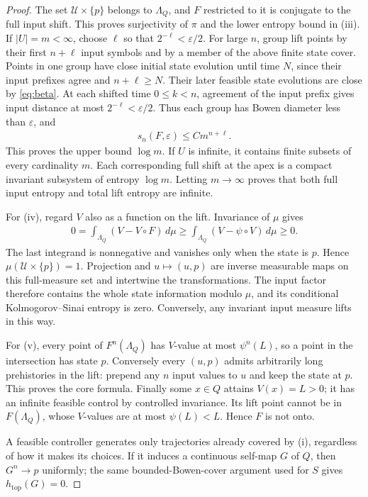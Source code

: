 \documentclass[11pt,a4paper]{article}
\theoremstyle{definition}
\theoremstyle{remark}
\begin{document}
\begin{proof}
The set \(\mathcal U\times\{p\}\) belongs to \(\Lambda_Q\), and \(F\) restricted to it is conjugate to the full input shift. This proves surjectivity of \(\pi\) and the lower entropy bound in (iii). If \(|U|=m<\infty\), choose \(\ell\) so that \(2^{-\ell}<\varepsilon/2\). For large \(n\), group lift points by their first \(n+\ell\) input symbols and by a member of the above finite state cover. Points in one group have close initial state evolution until time \(N\), since their input prefixes agree and \(n+\ell\geq N\). Their later feasible state evolutions are close by \eqref{eq:beta}. At each shifted time \(0\leq k<n\), agreement of the input prefix gives input distance at most \(2^{-\ell}<\varepsilon/2\). Thus each group has Bowen diameter less than \(\varepsilon\), and
\begin{align*}
 s_n(F,\varepsilon)\leq C m^{n+\ell}.
\end{align*}
This proves the upper bound \(\log m\). If \(U\) is infinite, it contains finite subsets of every cardinality \(m\). Each corresponding full shift at the apex is a compact invariant subsystem of entropy \(\log m\). Letting \(m\to\infty\) proves that both full input entropy and total lift entropy are infinite.

For (iv), regard \(V\) also as a function on the lift. Invariance of \(\mu\) gives
\begin{align*}
 0=\int_{\Lambda_Q}(V-V\circ F)\,d\mu
 \geq\int_{\Lambda_Q}(V-\psi\circ V)\,d\mu\geq0.
\end{align*}
The last integrand is nonnegative and vanishes only when the state is \(p\). Hence \(\mu(\mathcal U\times\{p\})=1\). Projection and \(u\mapsto(u,p)\) are inverse measurable maps on this full-measure set and intertwine the transformations. The input factor therefore contains the whole state information modulo \(\mu\), and its conditional Kolmogorov--Sinai entropy is zero. Conversely, any invariant input measure lifts in this way.

For (v), every point of \(F^n(\Lambda_Q)\) has \(V\)-value at most \(\psi^n(L)\), so a point in the intersection has state \(p\). Conversely every \((u,p)\) admits arbitrarily long prehistories in the lift: prepend any \(n\) input values to \(u\) and keep the state at \(p\). This proves the core formula. Finally some \(x\in Q\) attains \(V(x)=L>0\); it has an infinite feasible control by controlled invariance. Its lift point cannot be in \(F(\Lambda_Q)\), whose \(V\)-values are at most \(\psi(L)<L\). Hence \(F\) is not onto.

A feasible controller generates only trajectories already covered by (i), regardless of how it makes its choices. If it induces a continuous self-map \(G\) of \(Q\), then \(G^n\to p\) uniformly; the same bounded-Bowen-cover argument used for \(S\) gives \(h_{\mathrm{top}}(G)=0\).
\end{proof}
\end{document}
